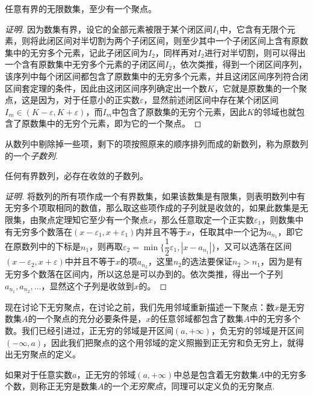 \begin{theorem}
  任意有界的无限数集，至少有一个聚点。
\end{theorem}

\begin{proof}[证明]
  因为数集有界，设它的全部元素被限于某个闭区间$I_1$中，它含有无限个元素，则将此闭区间对半切割为两个子闭区间，则至少其中一个子闭区间上含有原数集中的无穷多个元素，记此子闭区间为$I_2$，同样再对$I_2$进行对半切割，则可以得出一个含有原数集中无穷多个元素的子闭区间$I_2$，依次类推，得到一个闭区间序列，该序列中每个闭区间都包含了原数集中的无穷多个元素，并且这闭区间序列符合闭区间套定理的条件，因此由这闭区间序列确定出一个数$K$，它就是原数集的一个聚点，这是因为，对于任意小的正实数$\varepsilon$，显然前述闭区间中存在某个闭区间$I_m \in (K-\varepsilon,K+\varepsilon)$，而$I_m$中包含了原数集的无穷个元素，因此$K$的邻域也就包含了原数集中的无穷个元素，即为它的一个聚点。
\end{proof}

从数列中剔除掉一些项，剩下的项按照原来的顺序排列而成的新数列，称为原数列的一个\emph{子数列}.
\begin{inference}
  任何有界数列，必存在收敛的子数列。
\end{inference}

\begin{proof}[证明]
  将数列的所有项作成一个有界数集，如果该数集是有限集，则表明数列中有无穷多个项取相同的数值，那么取这些项作成的子列就是收敛的，如果此数集是无限集，由聚点定理知它至少有一个聚点$x$，那么任意取定一个正实数$\varepsilon_1$，则数集中有无穷多个数落在$(x-\varepsilon_1,x+\varepsilon_1)$内并且不等于$x$，任取其中一个记为$a_{n_1}$，即它在原数列中的下标是$n_1$，则再取$\varepsilon_2 = \min \{ \dfrac{1}{2}\varepsilon_1, |x-a_{n_1}| \}$，又可以选落在区间$(x-\varepsilon_2,x+\varepsilon)$中并且不等于$x$的项$a_{n_2}$，这里$n_2$的选法要保证$n_2>n_1$，因为是有无穷多个数落在区间内，所以这总是可以办到的。依次类推，得出一个子列$a_{n_1},a_{n_2},\ldots$，显然这个子列是收敛到$x$的。
\end{proof}

现在讨论下无穷聚点，在讨论之前，我们先用邻域重新描述一下聚点：数$x$是无穷数集$A$的一个聚点的充分必要条件是，$x$的任意邻域都包含了数集$A$中的无穷多个数。我们已经引进过，正无穷的邻域是开区间$(a,+\infty)$，负无穷的邻域是开区间$(-\infty,a)$，因此我们把聚点的这个用邻域的定义照搬到正无穷和负无穷上，就得出无穷聚点的定义。

\begin{definition}
  如果对于任意实数$a$，正无穷的邻域$(a,+\infty)$中总是包含着无穷数集$A$中的无穷多个数，则称正无穷是数集$A$的一个\emph{无穷聚点}，同理可以定义负的无穷聚点. 
\end{definition}

